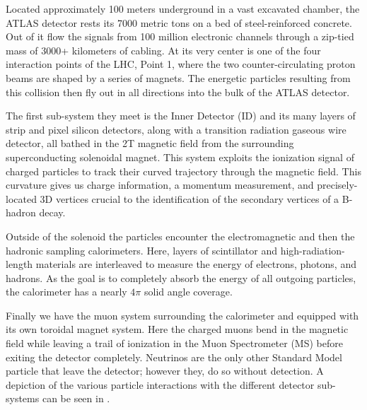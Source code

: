 Located approximately 100 meters underground in a vast excavated chamber, the
ATLAS detector rests its 7000 metric tons on a bed of steel-reinforced
concrete.  Out of it flow the signals from 100 million electronic channels
through a zip-tied mass of 3000+ kilometers of cabling.  At its very center is
one of the four interaction points of the LHC, Point 1, where the
two counter-circulating proton beams are shaped by a
series of magnets.  The energetic particles resulting from this collision then
fly out in all directions into the bulk of the ATLAS detector.

The first sub-system they meet is the Inner Detector (ID) and its many layers
of strip and pixel silicon detectors, along with a transition radiation gaseous
wire detector, all bathed in the 2T magnetic field from the surrounding
superconducting solenoidal magnet.  This system exploits the ionization signal
of charged particles to track their curved trajectory through the magnetic
field.  This curvature gives us charge information, a momentum measurement, and
precisely-located 3D vertices crucial to the identification of the secondary
vertices of a B-hadron decay. 

Outside of the solenoid the particles encounter the electromagnetic and then
the hadronic sampling calorimeters. Here, layers of scintillator and
high-radiation-length materials are interleaved to measure the energy of
electrons, photons, and hadrons. As the goal is to completely absorb the energy
of all outgoing particles, the calorimeter has a nearly $4\pi$ solid angle
coverage.

Finally we have the muon system surrounding the calorimeter and equipped with
its own toroidal magnet system.  Here the charged muons bend in the magnetic
field while leaving a trail of ionization in the Muon Spectrometer (MS) before
exiting the detector completely.  Neutrinos are the only other Standard Model
particle that leave the detector; however they, do so without detection.  A
depiction of the various particle interactions with the different detector
sub-systems can be seen in .

